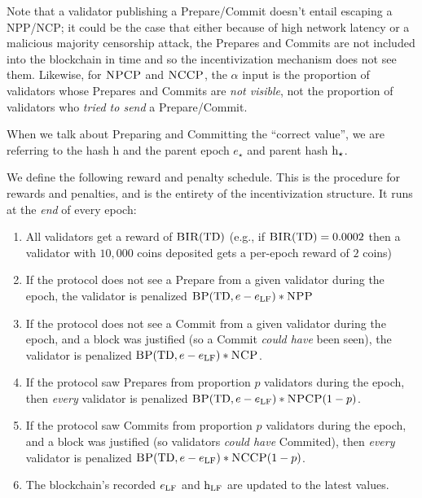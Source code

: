 \documentclass[12pt, final]{article}
\newcommand{\epoch}{\ensuremath{e}\xspace}
\newcommand{\hash}{\textnormal{h}\xspace}
\newcommand{\hashsource}{\ensuremath{\hash_{\star}}\xspace}
\newcommand{\epochsource}{\ensuremath{\epoch_{\star}}\xspace}
\newcommand{\BIR}{\textsc{BIR}\xspace}
\newcommand{\BP}{\textsc{BP}\xspace}
\newcommand{\NCP}{\textsc{NCP}\xspace}
\newcommand{\NCCP}{\textsc{NCCP}\xspace}
\newcommand{\NPP}{\textsc{NPP}\xspace}
\newcommand{\NPCP}{\textsc{NPCP}\xspace}
\newcommand{\totaldeposit}{\textnormal{TD}\xspace}
\newcommand{\epochLF}{\ensuremath{\epoch_{\textnormal{LF}}}\xspace}
\newcommand{\hashLF}{\ensuremath{\hash_{\textnormal{LF}}}\xspace} %
\begin{document}
Note that a validator publishing a Prepare/Commit doesn't entail escaping a \NPP/\NCP; it could be the case that either because of high network latency or a malicious majority censorship attack, the Prepares and Commits are not included into the blockchain in time and so the incentivization mechanism does not see them. Likewise, for $\NPCP$ and $\NCCP$, the $\alpha$ input is the proportion of validators whose Prepares and Commits are \emph{not visible}, not the proportion of validators who \emph{tried to send} a Prepare/Commit. 

When we talk about Preparing and Committing the ``correct value'', we are referring to the hash \hash and the parent epoch $\epochsource$ and parent hash $\hashsource$.

We define the following reward and penalty schedule.  This is the procedure for rewards and penalties, and is the entirety of the incentivization structure.  It runs at the \emph{end} of every epoch:
    \begin{enumerate}
    \item All validators get a reward of $\BIR(\totaldeposit)$ (e.g., if $\BIR(\totaldeposit) = 0.0002$ then a validator with $10,000$ coins deposited gets a per-epoch reward of $2$ coins)
    \item If the protocol does not see a Prepare from a given validator during the epoch, the validator is penalized $\BP(\totaldeposit, \epoch - \epochLF) * \NPP$ \todo{how does the incentive mechanism know \epoch?}
    \item If the protocol does not see a Commit from a given validator during the epoch, and a block was justified (so a Commit \emph{could have} been seen), the validator is penalized $\BP(\totaldeposit, \epoch - \epochLF) * \NCP$.
    \item If the protocol saw Prepares from proportion $p$ validators during the epoch, then \emph{every} validator is penalized $\BP(\totaldeposit, \epoch - \epochLF) * \NPCP(1 - p)$.
    \item If the protocol saw Commits from proportion $p$ validators during the epoch, and a block was justified (so validators \emph{could have} Commited), then \emph{every} validator is penalized $\BP(\totaldeposit, \epoch - \epochLF) * \NCCP(1 - p)$.
    \item The blockchain's recorded \epochLF and \hashLF are updated to the latest values. 
    \end{enumerate}
\end{document}
